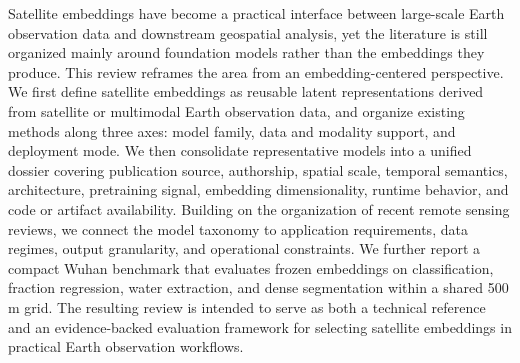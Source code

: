 Satellite embeddings have become a practical interface between large-scale Earth observation data and downstream geospatial analysis, yet the literature is still organized mainly around foundation models rather than the embeddings they produce. This review reframes the area from an embedding-centered perspective. We first define satellite embeddings as reusable latent representations derived from satellite or multimodal Earth observation data, and organize existing methods along three axes: model family, data and modality support, and deployment mode. We then consolidate \modelcount{} representative models into a unified dossier covering publication source, authorship, spatial scale, temporal semantics, architecture, pretraining signal, embedding dimensionality, runtime behavior, and code or artifact availability. Building on the organization of recent remote sensing reviews, we connect the model taxonomy to application requirements, data regimes, output granularity, and operational constraints. We further report a compact Wuhan benchmark that evaluates frozen embeddings on classification, fraction regression, water extraction, and dense segmentation within a shared 500\,m grid. The resulting review is intended to serve as both a technical reference and an evidence-backed evaluation framework for selecting satellite embeddings in practical Earth observation workflows.
